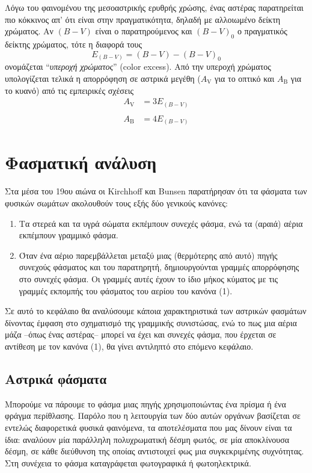 Λόγω του φαινομένου της μεσοαστρικής ερυθρής χρώσης, ένας αστέρας παρατηρείται πιο κόκκινος απ' ότι είναι στην πραγματικότητα, δηλαδή με αλλοιωμένο δείκτη χρώματος. Αν $(B-V)$ είναι ο παρατηρούμενος και $(B-V)_0$ ο πραγματικός δείκτης χρώματος, τότε η διαφορά τους
\begin{equation}
    E_{(B-V)} = (B-V) - (B-V)_0
\end{equation}
ονομάζεται ``\textit{υπεροχή χρώματος}'' (color excess). Από την υπεροχή χρώματος υπολογίζεται τελικά η απορρόφηση σε αστρικά μεγέθη ($A_{\text{V}}$ για το οπτικό και $A_{\text{B}}$ για το κυανό) από τις εμπειρικές σχέσεις
\begin{align}
    A_{\text{V}} & = 3 E_{(B-V)} \\\nonumber\\
    A_{\text{B}} & = 4 E_{(B-V)}
\end{align}


\section{Φασματική ανάλυση}
Στα μέσα του 19ου αιώνα οι Kirchhoff και Bunsen παρατήρησαν ότι τα φάσματα των φυσικών σωμάτων ακολουθούν τους εξής δύο γενικούς κανόνες:
\begin{enumerate}
    \item Τα στερεά και τα υγρά σώματα εκπέμπουν συνεχές φάσμα, ενώ τα (αραιά) αέρια εκπέμπουν γραμμικό φάσμα.
    \item Όταν ένα αέριο παρεμβάλλεται μεταξύ μιας (θερμότερης από αυτό) πηγής συνεχούς φάσματος και του παρατηρητή, δημιουργούνται γραμμές απορρόφησης στο συνεχές φάσμα. Οι γραμμές αυτές έχουν το ίδιο μήκος κύματος με τις γραμμές εκπομπής του φάσματος του αερίου του κανόνα (1).
\end{enumerate}

Σε αυτό το κεφάλαιο θα αναλύσουμε κάποια χαρακτηριστικά των αστρικών φασμάτων δίνοντας έμφαση στο σχηματισμό της γραμμικής συνιστώσας, ενώ το πως μια αέρια μάζα --όπως ένας αστέρας-- μπορεί να έχει και συνεχές φάσμα, που έρχεται σε αντίθεση με τον κανόνα (1), θα γίνει αντιληπτό στο επόμενο κεφάλαιο.

\subsection{Αστρικά φάσματα}

Μπορούμε να πάρουμε το φάσμα μιας πηγής χρησιμοποιώντας ένα πρίσμα ή ένα φράγμα περίθλασης. Παρόλο που η λειτουργία των δύο αυτών οργάνων βασίζεται σε εντελώς διαφορετικά φυσικά φαινόμενα, τα αποτελέσματα που μας δίνουν είναι τα ίδια: αναλύουν μία παράλληλη πολυχρωματική δέσμη φωτός, σε μία αποκλίνουσα δέσμη, σε κάθε διεύθυνση της οποίας αντιστοιχεί φως μια συγκεκριμένης συχνότητας. Στη συνέχεια το φάσμα καταγράφεται φωτογραφικά ή φωτοηλεκτρικά.

